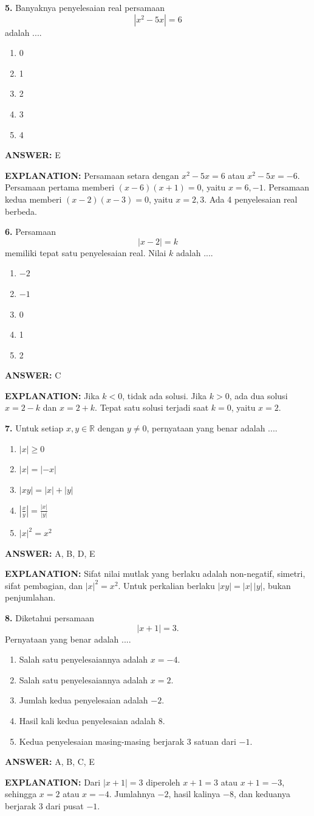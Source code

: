 \documentclass[11pt,a4paper]{article}
\newcommand{\answer}[1]{\par\medskip\textbf{\color{jawab}ANSWER:} #1\par}
\newcommand{\explanation}[1]{\textbf{\color{jelas}EXPLANATION:} #1\par\medskip}
\newcommand{\question}[1]{\Needspace{8\baselineskip}\par\medskip\textbf{#1}\quad}
\newenvironment{choices}{\begin{enumerate}[label=\Alph*.,leftmargin=1.8em]}{\end{enumerate}}
\begin{document}
\question{5.} Banyaknya penyelesaian real persamaan
\[
|x^2-5x|=6
\]
adalah ....
\begin{choices}
\item 0
\item 1
\item 2
\item 3
\item 4
\end{choices}
\answer{E}
\explanation{Persamaan setara dengan $x^2-5x=6$ atau $x^2-5x=-6$. Persamaan pertama memberi $(x-6)(x+1)=0$, yaitu $x=6,-1$. Persamaan kedua memberi $(x-2)(x-3)=0$, yaitu $x=2,3$. Ada 4 penyelesaian real berbeda.}

\question{6.} Persamaan
\[
|x-2|=k
\]
memiliki tepat satu penyelesaian real. Nilai $k$ adalah ....
\begin{choices}
\item $-2$
\item $-1$
\item 0
\item 1
\item 2
\end{choices}
\answer{C}
\explanation{Jika $k<0$, tidak ada solusi. Jika $k>0$, ada dua solusi $x=2-k$ dan $x=2+k$. Tepat satu solusi terjadi saat $k=0$, yaitu $x=2$.}

\question{7.} Untuk setiap $x,y\in\mathbb{R}$ dengan $y\ne0$, pernyataan yang benar adalah ....
\begin{choices}
\item $|x|\ge0$
\item $|x|=|-x|$
\item $|xy|=|x|+|y|$
\item $\left|\frac{x}{y}\right|=\frac{|x|}{|y|}$
\item $|x|^2=x^2$
\end{choices}
\answer{A, B, D, E}
\explanation{Sifat nilai mutlak yang berlaku adalah non-negatif, simetri, sifat pembagian, dan $|x|^2=x^2$. Untuk perkalian berlaku $|xy|=|x|\,|y|$, bukan penjumlahan.}

\question{8.} Diketahui persamaan
\[
|x+1|=3.
\]
Pernyataan yang benar adalah ....
\begin{choices}
\item Salah satu penyelesaiannya adalah $x=-4$.
\item Salah satu penyelesaiannya adalah $x=2$.
\item Jumlah kedua penyelesaian adalah $-2$.
\item Hasil kali kedua penyelesaian adalah 8.
\item Kedua penyelesaian masing-masing berjarak 3 satuan dari $-1$.
\end{choices}
\answer{A, B, C, E}
\explanation{Dari $|x+1|=3$ diperoleh $x+1=3$ atau $x+1=-3$, sehingga $x=2$ atau $x=-4$. Jumlahnya $-2$, hasil kalinya $-8$, dan keduanya berjarak 3 dari pusat $-1$.}
\end{document}
